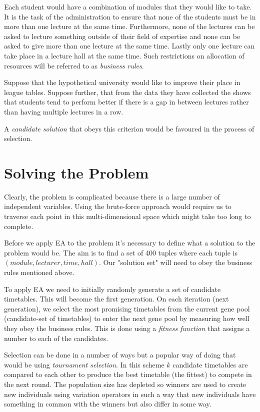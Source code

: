 \documentclass[a4paper, 12pt, draft, titlepage]{article}
\begin{document}
Each student would have a combination of modules that they would like to take.
It is the task of the administration to ensure that none of the students 
must be in more than one lecture at the same time. Furthermore, 
none of the lectures can be asked to lecture something outside of their field
of expertise and none can be asked to give more than one lecture at the same time.
Lastly only one lecture can take place in a lecture hall at the same time.
Such restrictions on allocation of resources will be referred to as \emph{business rules}.

Suppose that the hypothetical university would like to improve their
place in league tables. Suppose further,  that from the data they have
collected the shows that students tend to perform better if there is a
gap in between lectures rather than having multiple lectures in a row.

A \emph{candidate solution} that obeys this criterion would be favoured in the
process of selection.

\section*{Solving the Problem}

Clearly, the problem is complicated because there is a large number of independent
variables. Using the brute-force approach would require us to traverse each point 
in this multi-dimensional space which might take too long to complete.

Before we apply EA to the problem it's necessary to define what a solution to
the problem would be. The aim is to find a set of 400 tuples where each tuple
is $(module, lecturer, time, hall)$. Our "solution set" will need to obey the
business rules mentioned above. 

To apply EA we need to initially randomly generate a set of candidate
timetables. This will become the first generation.  On each iteration (next generation), we select the most promising timetables
from the current gene pool (candidate-set of timetables) to enter the next 
gene pool by measuring how well they obey the business rules. This is done
using a \emph{fitness function} that assigns a number to each of the candidates. 

Selection can be done in a number of ways but a popular way of doing
that would be using \emph{tournament selection}.  In this scheme $k$
candidate timetables are compared to each other to produce the best
timetable (the fittest) to compete in the next round.  The population
size has depleted so winners are used to create new individuals using
variation operators in such a way that new individuals have something
in common with the winners but also differ in some way.
\end{document}
